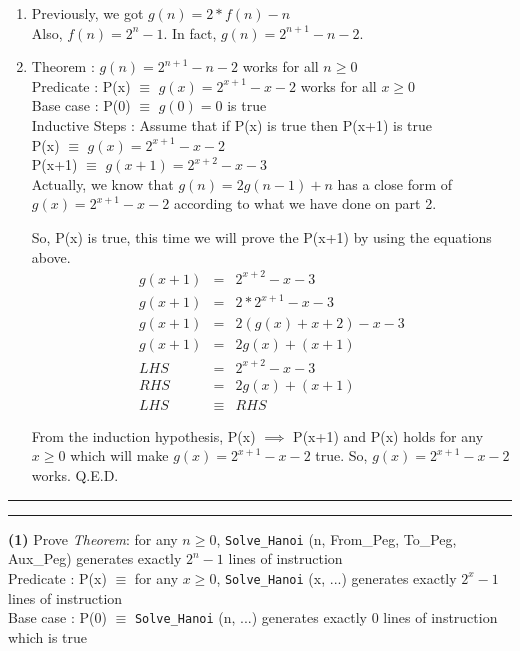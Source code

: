 \documentclass[a4paper, 11pt]{article}
\newcommand{\question}[2] {\vspace{.25in} \hrule\vspace{0.5em}
	\noindent{\bf #1: #2} \vspace{0.5em}
	\hrule \vspace{.10in}}
\renewcommand{\part}[1] {\vspace{.10in} {\bf (#1)}}
\begin{document}
\begin{enumerate}
		\item Previously, we got $g(n)=2*f(n)-n$\\
		Also, $f(n) = 2^n-1$. In fact, $g(n)=2^{n+1}-n-2$.
		\item Theorem : $g(n)=2^{n+1}-n-2$ works for all $n\geq0$\\
		Predicate : P(x) $\equiv$ $g(x)=2^{x+1}-x-2$ works for all $x\geq0$\\
		Base case : P(0) $\equiv$ $g(0)=0$ is true\\
		Inductive Steps : Assume that if P(x) is true then P(x+1) is true\\
		P(x)  $\equiv$ $g(x)=2^{x+1}-x-2$\\
		P(x+1)  $\equiv$ $g(x+1)=2^{x+2}-x-3$\\
		Actually, we know that $g(n)=2g(n-1)+n$ has a close form of $g(x)=2^{x+1}-x-2$ according to what we have done on part 2.
		
		So, P(x) is true, this time we will prove the P(x+1) by using the equations above.
		\begin{eqnarray}
		g(x+1)&=&2^{x+2}-x-3\\
		g(x+1)&=&2*2^{x+1}-x-3\\
		g(x+1)&=&2(g(x)+x+2)-x-3\\
		g(x+1)&=&2g(x)+(x+1)\\
		LHS &=& 2^{x+2}-x-3\\
		RHS &=& 2g(x)+(x+1)\\
		LHS &\equiv& RHS
		\end{eqnarray}
		
		From the induction hypothesis, P(x) $\implies$ P(x+1) and P(x) holds for any $x \geq 0$ which will make $g(x)=2^{x+1}-x-2$ true. So, $g(x)=2^{x+1}-x-2$ works. Q.E.D.\\
	\end{enumerate}

	\question{6}{Penultimate}
	\part{1} Prove {\em Theorem}:
	for any $n \geq 0$, \texttt{Solve\_Hanoi} (n, {From\_Peg}, {To\_Peg}, {Aux\_Peg}) generates exactly $2^n-1$ lines of instruction\\
	
	Predicate : P(x) $\equiv$ for any $x \geq 0$, \texttt{Solve\_Hanoi} (x, ...) generates exactly $2^x-1$ lines of instruction\\
	
	Base case : P(0) $\equiv$ \texttt{Solve\_Hanoi} (n, ...) generates exactly 0 lines of instruction which is true\\
	
\end{document}
